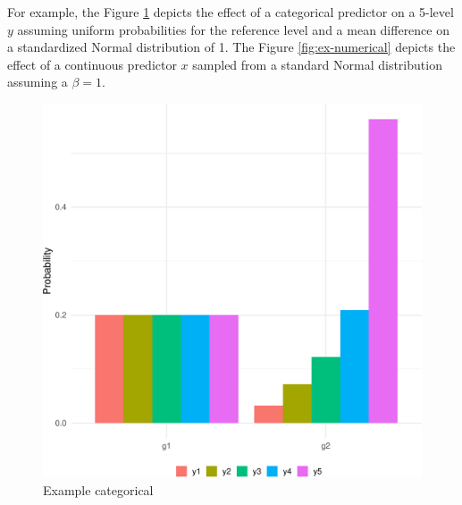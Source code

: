 \documentclass[
  man,floatsintext]{apa6}
\newenvironment{Shaded}{\begin{snugshade}}{\end{snugshade}}
\newcommand{\AttributeTok}[1]{\textcolor[rgb]{0.13,0.29,0.53}{#1}}
\newcommand{\FunctionTok}[1]{\textcolor[rgb]{0.13,0.29,0.53}{\textbf{#1}}}
\newcommand{\NormalTok}[1]{#1}
\newcommand{\SpecialCharTok}[1]{\textcolor[rgb]{0.81,0.36,0.00}{\textbf{#1}}}
\newcommand{\StringTok}[1]{\textcolor[rgb]{0.31,0.60,0.02}{#1}}
\begin{document}
\begin{Shaded}
\end{Shaded}

For example, the Figure \ref{fig:ex-categorical} depicts the effect of a categorical predictor on a 5-level \(y\) assuming uniform probabilities for the reference level and a mean difference on a standardized Normal distribution of 1. The Figure \ref{fig:ex-numerical} depicts the effect of a continuous predictor \(x\) sampled from a standard Normal distribution assuming a \(\beta = 1\).

\begin{figure}

{\centering \includegraphics{paper-new_files/figure-latex/ex-categorical-1} 

}

\caption{Example categorical}\label{fig:ex-categorical}
\end{figure}
\end{document}
